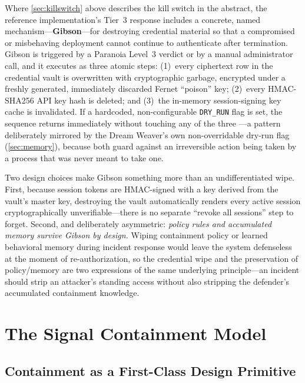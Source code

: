 \documentclass[11pt,a4paper]{article}
\begin{document}
Where \cref{sec:killswitch} above describes the kill switch in the abstract, the reference
implementation's Tier~3 response includes a concrete, named mechanism---\textbf{Gibson}---for
destroying credential material so that a compromised or misbehaving deployment cannot continue to
authenticate after termination. Gibson is triggered by a Paranoia Level~3 verdict or by a manual
administrator call, and it executes as three atomic steps: (1)~every ciphertext row in the
credential vault is overwritten with cryptographic garbage, encrypted under a freshly generated,
immediately discarded Fernet ``poison'' key; (2)~every HMAC-SHA256 API key hash is deleted; and
(3)~the in-memory session-signing key cache is invalidated. If a hardcoded, non-configurable
\texttt{DRY\_RUN} flag is set, the sequence returns immediately without touching any of the three
---a pattern deliberately mirrored by the Dream Weaver's own non-overridable dry-run flag
(\cref{sec:memory}), because both guard against an irreversible action being taken by a process
that was never meant to take one.

Two design choices make Gibson something more than an undifferentiated wipe. First, because
session tokens are HMAC-signed with a key derived from the vault's master key, destroying the
vault automatically renders every active session cryptographically unverifiable---there is no
separate ``revoke all sessions'' step to forget. Second, and deliberately asymmetric: \emph{policy
rules and accumulated memory survive Gibson by design.} Wiping containment policy or learned
behavioral memory during incident response would leave the system defenseless at the moment of
re-authorization, so the credential wipe and the preservation of policy/memory are two expressions
of the same underlying principle---an incident should strip an attacker's standing access without
also stripping the defender's accumulated containment knowledge.

\section{The Signal Containment Model}
\label{sec:containment}

\subsection{Containment as a First-Class Design Primitive}
\end{document}
